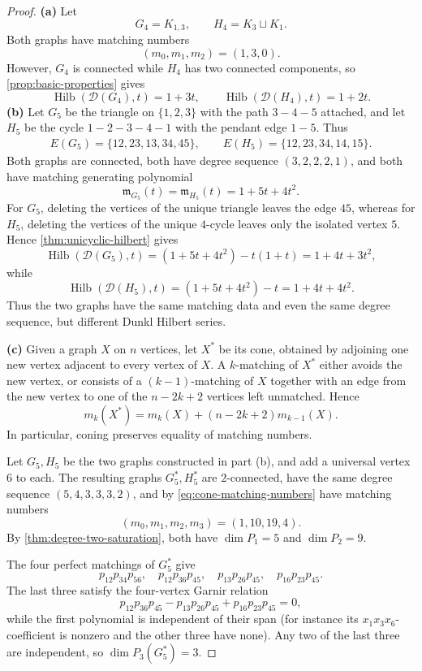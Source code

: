 \documentclass[12pt]{amsart}
\theoremstyle{definition}
\theoremstyle{remark}
\newcommand{\Hilb}{\operatorname{Hilb}}
\begin{document}
\begin{proof}
\textbf{(a)} Let
\[
 G_4=K_{1,3},
 \qquad
 H_4=K_3\sqcup K_1.
\]
Both graphs have matching numbers
\[
 (m_0,m_1,m_2)=(1,3,0).
\]
However, $G_4$ is connected while $H_4$ has two connected components, so
\cref{prop:basic-properties} gives
\[
 \Hilb(\mathcal D(G_4),t)=1+3t,
 \qquad
 \Hilb(\mathcal D(H_4),t)=1+2t.
\]
\medskip\noindent\textbf{(b)} Let $G_5$ be the triangle
on $\{1,2,3\}$ with the path $3-4-5$ attached, and let $H_5$ be the cycle
$1-2-3-4-1$ with the pendant edge $1-5$.  Thus
\begin{align*}
 E(G_5)=\{12,23,13,34,45\},\qquad
 E(H_5)=\{12,23,34,14,15\}.
\end{align*}
Both graphs are connected, both have degree sequence $(3,2,2,2,1)$, and
both have matching generating polynomial
\[
 \mathfrak m_{G_5}(t)=\mathfrak m_{H_5}(t)=1+5t+4t^2.
\]
For $G_5$, deleting the vertices of the unique triangle leaves the edge
$45$, whereas for $H_5$, deleting the vertices of the unique $4$-cycle
leaves only the isolated vertex $5$.  Hence
\cref{thm:unicyclic-hilbert} gives
\[
 \Hilb(\mathcal D(G_5),t)
 =(1+5t+4t^2)-t(1+t)=1+4t+3t^2,
\]
while
\[
 \Hilb(\mathcal D(H_5),t)
 =(1+5t+4t^2)-t=1+4t+4t^2.
\]
Thus the two graphs have the same matching data and even the same degree
sequence, but different Dunkl Hilbert series.

\medskip\noindent\textbf{(c)} Given a graph $X$ on $n$ vertices, let $X^\ast$ be its cone, obtained by
adjoining one new vertex adjacent to every vertex of $X$.  A $k$-matching of
$X^\ast$ either avoids the new vertex, or consists of a $(k-1)$-matching of
$X$ together with an edge from the new vertex to one of the
$n-2k+2$ vertices left unmatched.  Hence
\begin{equation}\label{eq:cone-matching-numbers}
 m_k(X^\ast)=m_k(X)+(n-2k+2)m_{k-1}(X).
\end{equation}
In particular, coning preserves equality of matching numbers.

Let $G_5,H_5$ be the two graphs constructed in part (b), and add a universal vertex
$6$ to each.  The resulting graphs $G_5^\ast,H_5^\ast$ are $2$-connected,
have the same degree sequence $(5,4,3,3,3,2)$, and by
\eqref{eq:cone-matching-numbers} have matching numbers
\[
 (m_0,m_1,m_2,m_3)=(1,10,19,4).
\]
By \cref{thm:degree-two-saturation}, both have
$\dim P_1=5$ and $\dim P_2=9$.

The four perfect matchings of $G_5^\ast$ give
\[
 p_{12}p_{34}p_{56},\quad
 p_{12}p_{36}p_{45},\quad
 p_{13}p_{26}p_{45},\quad
 p_{16}p_{23}p_{45}.
\]
The last three satisfy the four-vertex Garnir relation
\[
 p_{12}p_{36}p_{45}-p_{13}p_{26}p_{45}
   +p_{16}p_{23}p_{45}=0,
\]
while the first polynomial is independent of their span (for instance its
$x_1x_3x_6$-coefficient is nonzero and the other three have none).  Any two
of the last three are independent, so $\dim P_3(G_5^\ast)=3$.


\end{proof}
\end{document}
